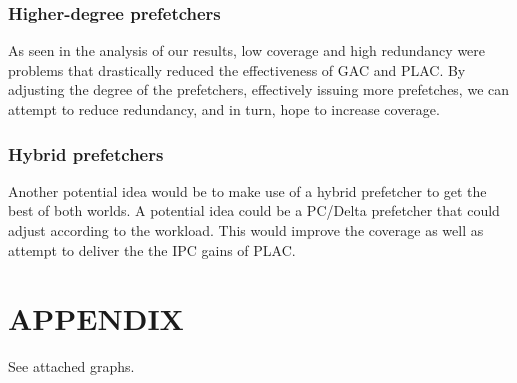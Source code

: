\documentclass[conference]{IEEEtran}
\begin{document}
    \subsubsection{Higher-degree prefetchers}
    As seen in the analysis of our results, low coverage and high redundancy were problems that drastically reduced the effectiveness of GAC and PLAC. By adjusting the degree of the prefetchers, effectively issuing more prefetches, we can attempt to reduce redundancy, and in turn, hope to increase coverage.
    
    \subsubsection{Hybrid prefetchers}
    Another potential idea would be to make use of a hybrid prefetcher to get the best of both worlds. A potential idea could be a PC/Delta prefetcher that could adjust according to the workload. This would improve the coverage as well as attempt to deliver the the IPC gains of PLAC.

\addtolength{\textheight}{-12cm}   %

\section*{APPENDIX}

    See attached graphs. %
\end{document}
